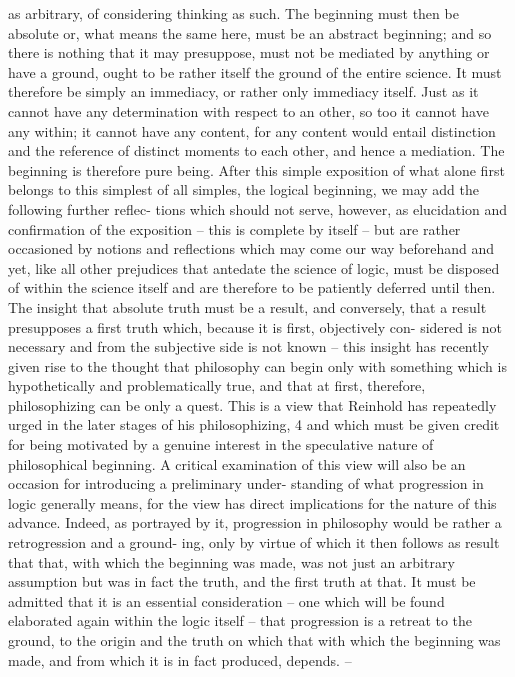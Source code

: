 as arbitrary, of considering thinking as such. The beginning must then be
absolute or, what means the same here, must be an abstract beginning; and
so there is nothing that it may presuppose, must not be mediated by anything
or have a ground, ought to be rather itself the ground of the entire science.
It must therefore be simply an immediacy, or rather only immediacy itself.
Just as it cannot have any determination with respect to an other, so too it
cannot have any within; it cannot have any content, for any content would
entail distinction and the reference of distinct moments to each other, and
hence a mediation. The beginning is therefore pure being.
After this simple exposition of what alone first belongs to this simplest of
all simples, the logical beginning, we may add the following further reflec-
tions which should not serve, however, as elucidation and confirmation of
the exposition – this is complete by itself – but are rather occasioned by
notions and reflections which may come our way beforehand and yet, like
all other prejudices that antedate the science of logic, must be disposed
of within the science itself and are therefore to be patiently deferred until
then.
The insight that absolute truth must be a result, and conversely, that a
result presupposes a first truth which, because it is first, objectively con-
sidered is not necessary and from the subjective side is not known – this
insight has recently given rise to the thought that philosophy can begin only
with something which is hypothetically and problematically true, and that
at first, therefore, philosophizing can be only a quest. This is a view that
Reinhold has repeatedly urged in the later stages of his philosophizing, 4
and which must be given credit for being motivated by a genuine interest
in the speculative nature of philosophical beginning. A critical examination
of this view will also be an occasion for introducing a preliminary under-
standing of what progression in logic generally means, for the view has
direct implications for the nature of this advance. Indeed, as portrayed by
it, progression in philosophy would be rather a retrogression and a ground-
ing, only by virtue of which it then follows as result that that, with which
the beginning was made, was not just an arbitrary assumption but was in
fact the truth, and the first truth at that.
It must be admitted that it is an essential consideration – one which
will be found elaborated again within the logic itself – that progression is a
retreat to the ground, to the origin and the truth on which that with which
the beginning was made, and from which it is in fact produced, depends. –
